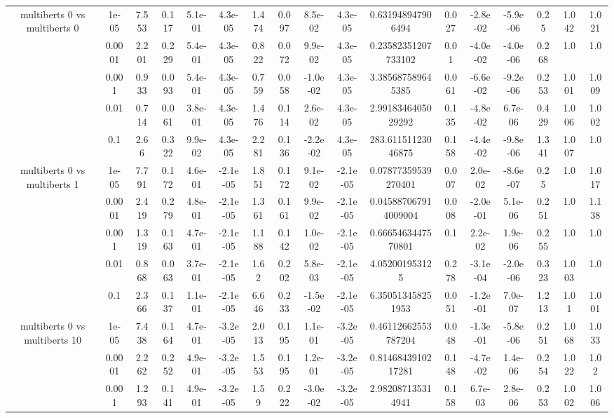 \begin{tabular}{|c|c|c|c|c|c|c|c|c|c|c|c|c|c|c|c|c|}
\hline
\multirow{5}{*}{multiberts 0 vs multiberts 0} & 1e-05 & 7.553 & 0.117 & 5.1e-01 & 4.3e-05 & 1.474 & 0.097 & 8.5e-02 & 4.3e-05 & 0.631948947906494 & 0.027 & -2.8e-02 & -5.9e-06 & 0.25 & 1.042 & 1.021 \\
 & 0.0001 & 2.201 & 0.229 & 5.4e-01 & 4.3e-05 & 0.822 & 0.072 & 9.9e-02 & 4.3e-05 & 0.23582351207733102 & 0.01 & -4.0e-02 & -4.0e-06 & 0.268 & 1.0 & 1.0 \\
 & 0.001 & 0.933 & 0.093 & 5.4e-01 & 4.3e-05 & 0.759 & 0.058 & -1.0e-02 & 4.3e-05 & 3.385687589645385 & 0.061 & -6.6e-02 & -9.2e-06 & 0.253 & 1.001 & 1.009 \\
 & 0.01 & 0.714 & 0.061 & 3.8e-01 & 4.3e-05 & 1.476 & 0.114 & 2.6e-02 & 4.3e-05 & 2.9918346405029292 & 0.135 & -4.8e-02 & 6.7e-06 & 0.429 & 1.006 & 1.002 \\
 & 0.1 & 2.66 & 0.322 & 9.9e-02 & 4.3e-05 & 2.281 & 0.136 & -2.2e-02 & 4.3e-05 & 283.61151123046875 & 0.158 & -4.4e-02 & -9.8e-06 & 1.341 & 1.007 & 1.0 \\
\hline
\multirow{5}{*}{multiberts 0 vs multiberts 1} & 1e-05 & 7.791 & 0.172 & 4.6e-01 & -2.1e-05 & 1.851 & 0.172 & 9.1e-02 & -2.1e-05 & 0.07877359539270401 & 0.007 & 2.0e-02 & -8.6e-07 & 0.25 & 1.0 & 1.017 \\
 & 0.0001 & 2.419 & 0.279 & 4.8e-01 & -2.1e-05 & 1.361 & 0.161 & 9.9e-02 & -2.1e-05 & 0.045887067914009004 & 0.008 & -2.0e-01 & 5.1e-06 & 0.251 & 1.0 & 1.138 \\
 & 0.001 & 1.319 & 0.163 & 4.7e-01 & -2.1e-05 & 1.188 & 0.142 & 1.0e-02 & -2.1e-05 & 0.6665463447570801 & 0.1 & 2.2e-02 & 1.9e-06 & 0.255 & 1.0 & 1.0 \\
 & 0.01 & 0.868 & 0.063 & 3.7e-01 & -2.1e-05 & 1.62 & 0.202 & 5.8e-03 & -2.1e-05 & 4.052001953125 & 0.278 & -3.1e-04 & -2.0e-06 & 0.323 & 1.003 & 1.0 \\
 & 0.1 & 2.366 & 0.137 & 1.1e-01 & -2.1e-05 & 6.646 & 0.233 & -1.5e-02 & -2.1e-05 & 6.350513458251953 & 0.051 & -1.2e-01 & 7.0e-07 & 1.213 & 1.01 & 1.001 \\
\hline
\multirow{5}{*}{multiberts 0 vs multiberts 10} & 1e-05 & 7.438 & 0.164 & 4.7e-01 & -3.2e-05 & 2.013 & 0.195 & 1.1e-01 & -3.2e-05 & 0.46112662553787204 & 0.048 & -1.3e-01 & -5.8e-06 & 0.251 & 1.068 & 1.033 \\
 & 0.0001 & 2.262 & 0.252 & 4.9e-01 & -3.2e-05 & 1.553 & 0.195 & 1.2e-01 & -3.2e-05 & 0.8146843910217281 & 0.148 & -4.7e-02 & 1.4e-06 & 0.254 & 1.022 & 1.02 \\
 & 0.001 & 1.293 & 0.141 & 4.9e-01 & -3.2e-05 & 1.59 & 0.222 & -3.0e-02 & -3.2e-05 & 2.982087135314941 & 0.158 & 6.7e-03 & 2.8e-06 & 0.253 & 1.002 & 1.006 \\

\end{tabular}
